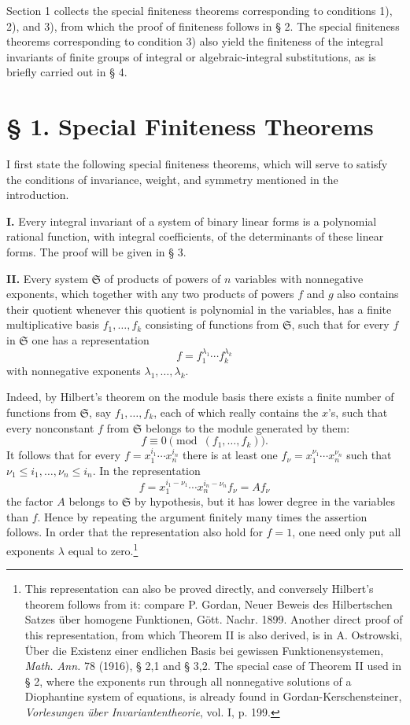 \documentclass[11pt]{article}
\providecommand{\frS}{\mathfrak S}
\begin{document}
Section 1 collects the special finiteness theorems corresponding to conditions 1), 2), and 3), from which the proof of finiteness follows in § 2. The special finiteness theorems corresponding to condition 3) also yield the finiteness of the integral invariants of finite groups of integral or algebraic-integral substitutions, as is briefly carried out in § 4.

\section*{§ 1. Special Finiteness Theorems}

I first state the following special finiteness theorems, which will serve to satisfy the conditions of invariance, weight, and symmetry mentioned in the introduction.

\textbf{I.} Every integral invariant of a system of binary linear forms is a polynomial rational function, with integral coefficients, of the determinants of these linear forms. The proof will be given in § 3.

\textbf{II.} Every system \(\frS\) of products of powers of \(n\) variables with nonnegative exponents, which together with any two products of powers \(f\) and \(g\) also contains their quotient whenever this quotient is polynomial in the variables, has a finite multiplicative basis \(f_1,\ldots,f_k\) consisting of functions from \(\frS\), such that for every \(f\) in \(\frS\) one has a representation
\[
        f=f_1^{\lambda_1}\cdots f_k^{\lambda_k}
\]
with nonnegative exponents \(\lambda_1,\ldots,\lambda_k\).

Indeed, by Hilbert's theorem on the module basis there exists a finite number of functions from \(\frS\), say \(f_1,\ldots,f_k\), each of which really contains the \(x\)'s, such that every nonconstant \(f\) from \(\frS\) belongs to the module generated by them:
\[
        f\equiv0\pmod{(f_1,\ldots,f_k)}.
\]
It follows that for every \(f=x_1^{i_1}\cdots x_n^{i_n}\) there is at least one \(f_\nu=x_1^{\nu_1}\cdots x_n^{\nu_n}\) such that \(\nu_1\le i_1,\ldots,\nu_n\le i_n\). In the representation
\[
        f=x_1^{i_1-\nu_1}\cdots x_n^{i_n-\nu_n} f_\nu = A f_\nu
\]
the factor \(A\) belongs to \(\frS\) by hypothesis, but it has lower degree in the variables than \(f\). Hence by repeating the argument finitely many times the assertion follows. In order that the representation also hold for \(f=1\), one need only put all exponents \(\lambda\) equal to zero.\footnote{This representation can also be proved directly, and conversely Hilbert's theorem follows from it: compare P. Gordan, Neuer Beweis des Hilbertschen Satzes über homogene Funktionen, Gött. Nachr. 1899. Another direct proof of this representation, from which Theorem II is also derived, is in A. Ostrowski, Über die Existenz einer endlichen Basis bei gewissen Funktionensystemen, \emph{Math. Ann.} 78 (1916), § 2,1 and § 3,2. The special case of Theorem II used in § 2, where the exponents run through all nonnegative solutions of a Diophantine system of equations, is already found in Gordan-Kerschensteiner, \emph{Vorlesungen über Invariantentheorie}, vol. I, p. 199.}
\end{document}
